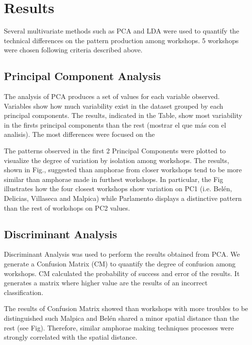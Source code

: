 \documentclass[review]{elsarticle}
\begin{document}
\section{Results}

Several multivariate methods such as PCA and LDA were used to quantify the technical differences on the pattern production among workshops. 5 workshops were chosen following criteria described above. 


\subsection{Principal Component Analysis}

The analysis of PCA produces a set of values for each variable observed. Variables show how much variability exist in the dataset grouped by each principal components. The results, indicated in the Table, show most variability in the firsts principal components than the rest (mostrar el que más con el analisis).
The most differences were focused on the %

The patterns observed in the first 2 Principal Components were plotted to visualize the degree of variation by isolation among workshops. The results, shown in Fig., suggested than amphorae from closer workshops tend to be more similar than amphorae made in furthest workshops. In particular, the Fig illustrates how the four closest workshops show variation on PC1 (i.e. Belén, Delicias, Villaseca and Malpica) while Parlamento displays a distinctive pattern than the rest of workshops on PC2 values. 


\subsection{Discriminant Analysis}


Discriminant Analysis was used to perform the results obtained from PCA. We generate a Confusion Matrix (CM) to quantify the degree of confusion among workshops. CM calculated the probability of success and error of the results. It generates a matrix where higher value are the results of an incorrect classification. 

The results of Confusion Matrix showed than workshops with more troubles to be distinguished such Malpica and Bel\'en shared a minor spatial distance than the rest (see Fig). Therefore, similar amphorae making techniques processes were strongly correlated with the spatial distance. 
\end{document}
